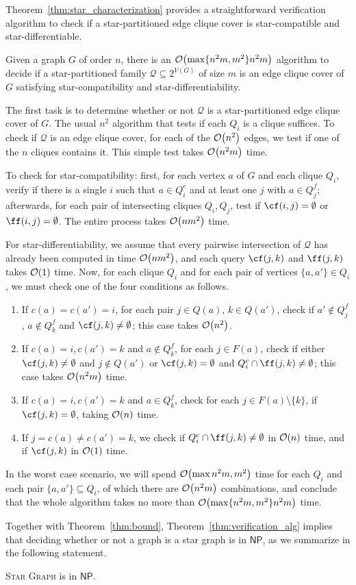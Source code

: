Theorem~\ref{thm:star_characterization} provides a straightforward verification algorithm to check if a star-partitioned edge clique cover is star-compatible and star-differentiable.

\begin{theorem}
    \label{thm:verification_alg}
    Given a graph $G$ of order $n$, there is an $\mathcal{O}\!\left(\max\{n^2m, m^2\}n^2m\right)$ algorithm to decide if a star-partitioned family $\mathcal{Q} \subseteq 2^{V(G)}$ of size $m$ is an edge clique cover of $G$ satisfying star-compatibility and star-differentiability. 
\end{theorem}

\begin{tproof}
    The first task is to determine whether or not $\mathcal{Q}$ is a star-partitioned edge clique cover of $G$.
    The usual $n^2$ algorithm that tests if each $Q_i$ is a clique suffices.
    To check if $\mathcal{Q}$ is an edge clique cover, for each of the $\mathcal{O}\!\left(n^2\right)$ edges, we test if one of the $n$ cliques contains it. 
    This simple test takes $\mathcal{O}\!\left(n^2m\right)$ time.
    
    To check for star-compatibility: first, for each vertex $a$ of $G$ and each clique $Q_i$, verify if there is a single $i$ such that $a \in Q_i^c$ and at least one $j$ with $a \in Q_j^f$;
    afterwards, for each pair of intersecting cliques $Q_i, Q_j$, test if $\cf(i,j) = \emptyset$ or $\ff(i,j) = \emptyset$.
    The entire process takes $\mathcal{O}\!\left(nm^2\right)$ time.
    
    For star-differentiability, we assume that every pairwise intersection of $\mathcal{Q}$ has already been computed in time $\mathcal{O}\!\left(nm^2\right)$, and each query $\cf(j,k)$ and $\ff(j,k)$ takes $\mathcal{O}\!\left(1\right)$ time.
    Now, for each clique $Q_i$ and for each pair of vertices $\{a, a'\} \in Q_i$, we must check one of the four conditions as follows.
    \begin{enumerate}
        \item If $c(a) = c(a') = i$, for each pair $j \in Q(a)$, $k \in Q(a')$, check if $a' \notin Q_j^f$, $a \notin Q_k^f$ and $\cf(j,k) \neq \emptyset$; this case takes $\mathcal{O}\!\left(n^2\right)$.
        \item If $c(a) = i, c(a') = k$ and $a \notin Q_k^f$, for each $j \in F(a)$, check if either $\cf(j,k) \neq \emptyset$ and $j \notin Q(a')$ or $\cf(j,k) = \emptyset$ and $Q_i^c \cap \ff(j,k) \neq \emptyset$; this case takes $\mathcal{O}\!\left(n^2m\right)$ time.
        \item If $c(a) = i, c(a') = k$ and $a \in Q_k^f$, check for each $j \in F(a) \setminus \{k\}$, if $\cf(j,k) = \emptyset$, taking $\mathcal{O}\!\left(n\right)$ time.
        \item If $j = c(a) \neq c(a') = k$, we check if $Q_i^c \cap \ff(j,k) \neq \emptyset$ in $\mathcal{O}\!\left(n\right)$ time, and if $\cf(j,k)$ in $\mathcal{O}\!\left(1\right)$ time.
    \end{enumerate}
    In the worst case scenario, we will spend $\mathcal{O}\!\left(\max{n^2m, m^2}\right)$ time for each $Q_i$ and each pair $\{a, a'\} \subseteq Q_i$, of which there are $\mathcal{O}\!\left(n^2m\right)$ combinations, and conclude that the whole algorithm takes no more than $\mathcal{O}\!\left(\max\{n^2m, m^2\}n^2m\right)$ time.
\end{tproof}

Together with Theorem~\ref{thm:bound}, Theorem~\ref{thm:verification_alg} implies that deciding whether or not a graph is a star graph is in $\mathsf{NP}$, as we summarize in the following statement.

\begin{theorem}
    \textsc{Star Graph} is in $\mathsf{NP}$.
\end{theorem}